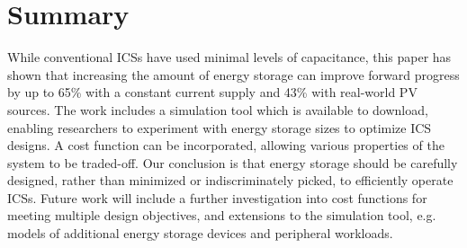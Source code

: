 \section{Summary} \label{sec:c4_summary}

While conventional ICSs have used minimal levels of capacitance, this paper has shown that increasing the amount of energy storage can improve forward progress by up to 65\% with a constant current supply and 43\% with real-world PV sources. The work includes a simulation tool which is available to download, enabling researchers to experiment with energy storage sizes to optimize ICS designs. A cost function can be incorporated, allowing various properties of the system to be traded-off. Our conclusion is that energy storage should be carefully designed, rather than minimized or indiscriminately picked, to efficiently operate ICSs. Future work will include a further investigation into cost functions for meeting multiple design objectives, and extensions to the simulation tool, e.g. models of additional energy storage devices and peripheral workloads.
